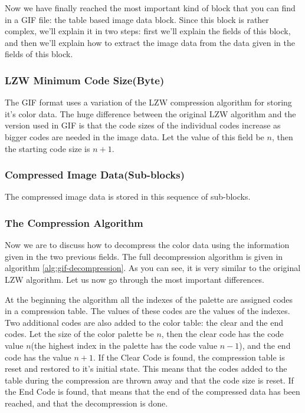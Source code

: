 Now we have finally reached the most important kind of block that you
can find in a GIF file: the table based image data block. Since this
block is rather complex, we'll explain it in two steps: first we'll
explain the fields of this block, and then we'll explain how to
extract the image data from the data given in the fields of this
block.

\subsubsection{LZW Minimum Code Size(Byte)}

The GIF format uses a variation of the LZW compression algorithm
for storing it's color data. The huge difference between the
original LZW algorithm and the version used in GIF is that the
code sizes of the individual codes increase as bigger codes are
needed in the image data.  Let the value of this field be $n$, then
the starting code size is $n + 1$.

\subsubsection{Compressed Image Data(Sub-blocks)}

The compressed image data is stored in this sequence of sub-blocks.

\subsubsection{The Compression Algorithm}

Now we are to discuss how to decompress the color data using the
information given in the two previous fields. The full decompression
algorithm is given in algorithm \ref{alg:gif-decompression}. As you
can see, it is very similar to the original LZW algorithm. Let us
now go through the most important differences.

At the beginning the algorithm all the indexes of the palette are
assigned codes in a compression table. The values of these codes are
the values of the indexes. Two additional codes are also added to the
color table: the clear and the end codes. Let the size of the color
palette be $n$, then the clear code has the code value $n$(the highest
index in the palette has the code value $n-1$), and the end code has
the value $n+1$. If the Clear Code is found, the compression table is
reset and restored to it's initial state. This means that the codes
added to the table during the compression are thrown away and that the
code size is reset. If the End Code is found, that means that the end
of the compressed data has been reached, and that the decompression is
done.

